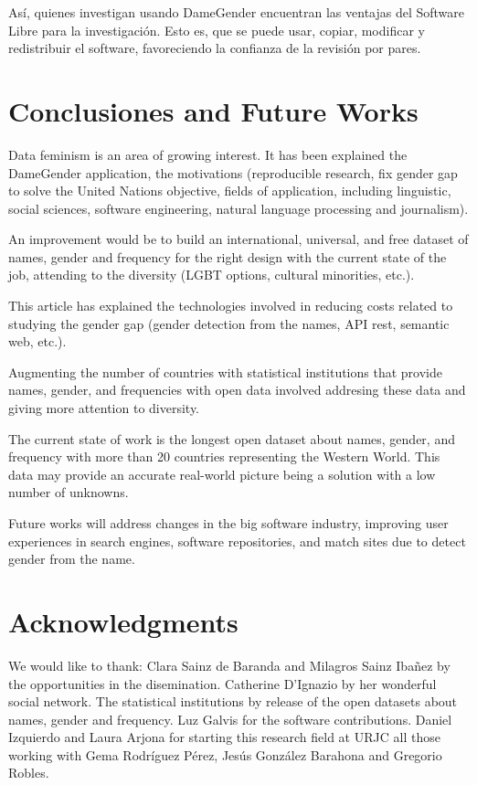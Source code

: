 \documentclass[a4paper]{article}
\begin{document}
Así, quienes investigan usando DameGender encuentran las ventajas del
Software Libre para la investigación. Esto es, que se puede usar, copiar,
modificar y redistribuir el software, favoreciendo la confianza de la revisión
por pares.

\section{Conclusiones and Future Works}
\label{sec:conclusions}

Data feminism\cite{d2020data} is an area of growing interest.
It has been explained the DameGender application,
the motivations (reproducible research, fix gender gap to solve the
United Nations objective, fields of application, including linguistic,
social sciences, software engineering, natural language processing and
journalism).

An improvement would be to build an international, universal, and free
dataset of names, gender and frequency for the right design with
the current state of the job, attending to the diversity (LGBT
options, cultural minorities, etc.).

This article has explained the technologies involved in reducing costs
related to studying the gender gap (gender detection from the names,
API rest, semantic web, etc.).

Augmenting the number of countries with statistical institutions
that provide names, gender, and frequencies with open data
involved addresing these data and giving more attention to
diversity.

The current state of work is the longest open dataset about names,
gender, and frequency with more than 20 countries representing the
Western World. This data may provide an accurate real-world picture
being a solution with a low number of unknowns.

Future works will address changes in the big software industry,
improving user experiences in search engines, software repositories,
and match sites due to detect gender from the name.


\section*{Acknowledgments}

We would like to thank: Clara Sainz de Baranda and Milagros Sainz
Ibañez by the opportunities in the disemination. Catherine D'Ignazio
by her wonderful social network. The statistical institutions by
release of the open datasets about names, gender and frequency.
Luz Galvis for the software contributions. Daniel Izquierdo and
Laura Arjona for starting this research field at URJC all those
working with Gema Rodríguez Pérez, Jesús González Barahona and
Gregorio Robles. 



\end{document}

